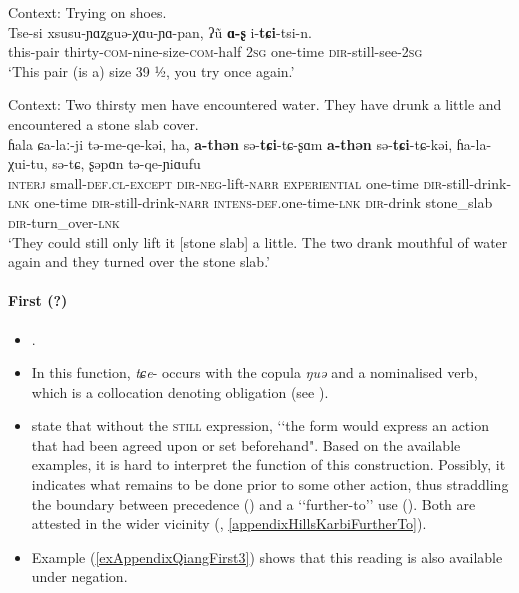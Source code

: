 \begin{exe}
	\ex 
	Context: Trying on shoes.\\
	\gll Tse-si xsusu-ɲɑʐguə-χɑu-ɲɑ-pan, ʔũ \textbf{ɑ-ʂ} i-\textbf{tɕi}-tsi-n.\\
	this-pair thirty-\textsc{com}-nine-size-\textsc{com}-half 2\textsc{sg} one-time \textsc{dir}-still-see-2\textsc{sg}\\
	\glt \lq This pair (is a) size 39 ½, you try once again.\rq{ }\parencite[170]{LaPollaHuang2003}
	
	\ex
	Context: Two thirsty men have encountered water. They have drunk a little and encountered a stone slab cover.\\
	\gll ɦala ɕa-laː-ji tə-me-qe-kəi, ha, \textbf{a-thən} sə-\textbf{tɕi}-tɕ-ʂɑm \textbf{a-thən} sə-\textbf{tɕi}-tɕ-kəi, ɦa-la-χui-tu, sə-tɕ, ʂəpɑn tə-qe-ɲiɑufu\\
	\textsc{interj} small-\textsc{def}.\textsc{cl}-\textsc{except} \textsc{dir}-\textsc{neg}-lift-\textsc{narr} \textsc{experiential} one-time \textsc{dir}-still-drink-\textsc{lnk} one-time \textsc{dir}-still-drink-\textsc{narr} \textsc{intens}-\textsc{def}.one-time-\textsc{lnk} \textsc{dir}-drink stone\_slab \textsc{dir}-turn\_over-\textsc{lnk}\\
	\glt \lq They could still only lift it [stone slab] a little. The two drank mouthful of water again and they turned over the stone slab.\rq{ }\parencite[311–312, 327]{LaPollaHuang2003}
\end{exe}

\paragraph{First (?)}\label{appendixNorthernQiangFirst}
\begin{itemize}
	\item  \textcite[194]{LaPollaHuang2003}.
	\item In this function, \mbox{\textit{tɕe}-} occurs with the copula \textit{ŋuə} and a nominalised verb, which is a collocation denoting obligation (see \cite[190–194]{LaPollaHuang2003}).
	\item \textcite[194]{LaPollaHuang2003} state that without the \textsc{still} expression, \lq\lq the form would express an action that had been agreed upon or set beforehand". Based on the available examples, it is hard to interpret the function of this construction. Possibly, it indicates what remains to be done prior to some other action, thus straddling the boundary between precedence () and a \lq\lq{}further-to\rq\rq{ }use (). Both are attested in the wider vicinity 
(, \ref{appendixHillsKarbiFurtherTo}).
	
	\item Example (\ref{exAppendixQiangFirst3}) shows that this reading is also available under negation.
\end{itemize}



